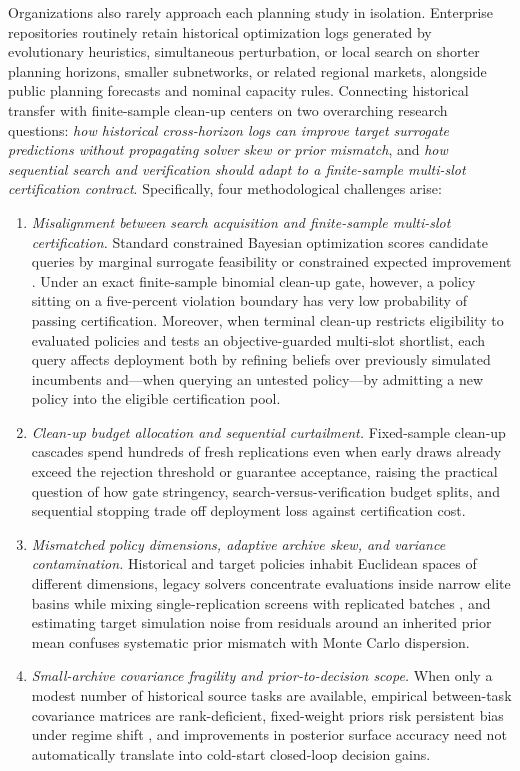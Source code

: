 Organizations also rarely approach each planning study in isolation. Enterprise repositories routinely retain historical optimization logs generated by evolutionary heuristics, simultaneous perturbation, or local search on shorter planning horizons, smaller subnetworks, or related regional markets, alongside public planning forecasts and nominal capacity rules. Connecting historical transfer with finite-sample clean-up centers on two overarching research questions: \emph{how historical cross-horizon logs can improve target surrogate predictions without propagating solver skew or prior mismatch}, and \emph{how sequential search and verification should adapt to a finite-sample multi-slot certification contract}. Specifically, four methodological challenges arise:
\begin{enumerate}
  \item \emph{Misalignment between search acquisition and finite-sample multi-slot certification.} Standard constrained Bayesian optimization scores candidate queries by marginal surrogate feasibility or constrained expected improvement \citep{gelbart2014bayesian,letham2019constrained,eriksson2021scalable,ungredda2024bayesian}. Under an exact finite-sample binomial clean-up gate, however, a policy sitting on a five-percent violation boundary has very low probability of passing certification. Moreover, when terminal clean-up restricts eligibility to evaluated policies and tests an objective-guarded multi-slot shortlist, each query affects deployment both by refining beliefs over previously simulated incumbents and—when querying an untested policy—by admitting a new policy into the eligible certification pool.
  \item \emph{Clean-up budget allocation and sequential curtailment.} Fixed-sample clean-up cascades spend hundreds of fresh replications even when early draws already exceed the rejection threshold or guarantee acceptance, raising the practical question of how gate stringency, search-versus-verification budget splits, and sequential stopping trade off deployment loss against certification cost.
  \item \emph{Mismatched policy dimensions, adaptive archive skew, and variance contamination.} Historical and target policies inhabit Euclidean spaces of different dimensions, legacy solvers concentrate evaluations inside narrow elite basins while mixing single-replication screens with replicated batches \citep{spall1992multivariate,hansen2006cma,deb2002fast}, and estimating target simulation noise from residuals around an inherited prior mean confuses systematic prior mismatch with Monte Carlo dispersion.
  \item \emph{Small-archive covariance fragility and prior-to-decision scope.} When only a modest number of historical source tasks are available, empirical between-task covariance matrices are rank-deficient, fixed-weight priors risk persistent bias under regime shift \citep{grunwald2017inconsistency,wang2024pretrained}, and improvements in posterior surface accuracy need not automatically translate into cold-start closed-loop decision gains.
\end{enumerate}

